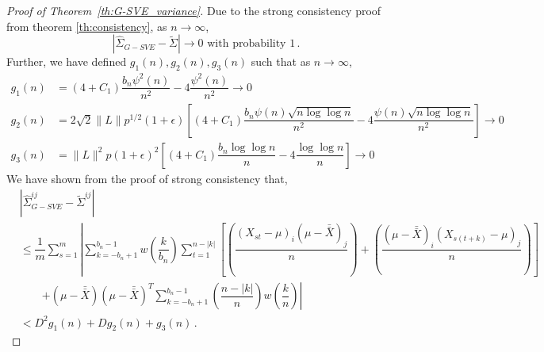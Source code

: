 \documentclass[11pt]{article}
\theoremstyle{remark}
\begin{document}
\begin{proof}[Proof of Theorem~\ref{th:G-SVE_variance}]
 Due to the strong consistency proof from theorem \ref{th:consistency}, as $n \to \infty$,
\begin{equation}
\label{eq:G-SVE_asv_consis}
 \left|\hat{\Sigma}_{G-SVE} -  \tilde{\Sigma}\right| \to 0 \text{ with probability 1}\,. 
\end{equation}
Further, we have defined $g_1(n), g_2(n), g_3(n)$ such that as $n \to \infty$,
\begin{align*}
    g_1(n) &= (4+C_1)\dfrac{b_n \psi^2(n)}{n^2} - 4\dfrac{\psi^2(n)}{n^2} \to 0\\
    g_2(n) &= 2\sqrt{2}\|L\|p^{1/2}(1+\epsilon)\left[(4+C_1)\dfrac{b_n\psi(n)\sqrt{n\log \log n}}{n^2} - 4\dfrac{\psi(n)\sqrt{n\log \log n}}{n^2}\right] \to 0\\
    g_3(n) &= \|L\|^2 p (1+\epsilon)^2\left[(4+C_1)\dfrac{b_n \log\log n}{n} - 4 \dfrac{\log \log n}{n}\right] \to 0
\end{align*}
%
We have shown from the proof of strong consistency that,
\begin{align*}
 &\left| \hat{\Sigma}_{G-SVE}^{ij} - \tilde{\Sigma}^{ij} \right|\\
 & \leq \dfrac{1}{m} \sum_{s=1}^m \left| \sum_{k=-b_n+1}^{b_n-1} w \left(\dfrac{k}{b_n} \right) \sum_{t=1}^{n-|k|}   \left[ \left( \dfrac{(X_{st} - \mu)_i(\mu-\bar{\bar{X}})_j}{n}\right)+ \left(\dfrac{(\mu-\bar{\bar{X}})_i(X_{s(t+k)}-\mu)_j}{n}\right) \right] \right.\\
& \quad \quad  \left. + (\mu-\bar{\bar{X}})(\mu-\bar{\bar{X}})^T\sum_{k=-b_n+1}^{b_n-1}\left(\dfrac{n-|k|}{n}\right)w\left(\dfrac{k}{n}\right) \right| \\ 
 & < D^2g_1(n) + Dg_2(n) + g_3(n)\,.
\end{align*}


\end{proof}
\end{document}
